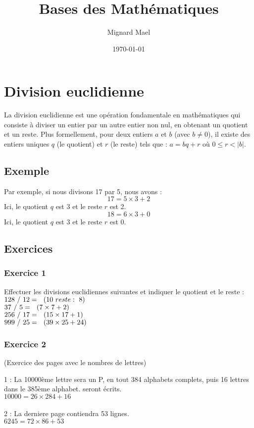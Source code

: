 \documentclass{article}
\title{Bases des Mathématiques}
\author{Mignard Mael}
\date{\today}
\begin{document}
\maketitle

\section{Division euclidienne}
La division euclidienne est une opération fondamentale en mathématiques qui consiste à diviser un entier par un autre entier non nul, en obtenant un quotient et un reste. Plus formellement, pour deux entiers \( a \) et \( b \) (avec \( b \neq 0 \)), il existe des entiers uniques \( q \) (le quotient) et \( r \) (le reste) tels que :
$ a = bq + r $
où \( 0 \leq r < |b| \).

\subsection{Exemple}
Par exemple, si nous divisons 17 par 5, nous avons :
\[ 17 = 5 \times 3 + 2
\]
Ici, le quotient \( q \) est 3 et le reste \( r \) est 2.
\[ 18 = 6 \times 3 + 0
\]
Ici, le quotient \( q \) est 3 et le reste \( r \) est 0.

\subsection{Exercices}
\subsubsection{Exercice 1}
Effectuer les divisions euclidiennes suivantes et indiquer le quotient et le reste :
 \\
$
128 \ / \ 12 =  \ \  (10  \ reste : \ 8 )\\
$
\\
$
37 \ / \ 5 =  \ \ (7 \times 7 +2)\\
$
\\
$
256  \ / \  17 =  \ \ (15 \times 17 +1) \\
$
\\
$999 \ / \ 25 =  \ \ (39 \times 25 +24) \\ 
$
\\
\subsubsection{Exercice 2}
(Exercice des pages avec le nombres de lettres)

1 : La 10000ème lettre sera un P, en tout 384 alphabets complets, puis 16 lettres dans le 385ème alphabet. seront écrits. 
\\
$10000 = 26 \times 284 + 16$  \\
\\ 
2 : La derniere page contiendra 53 lignes. \\
$6245 = 72 \times 86 + 53$ \\
\\
\end{document}
